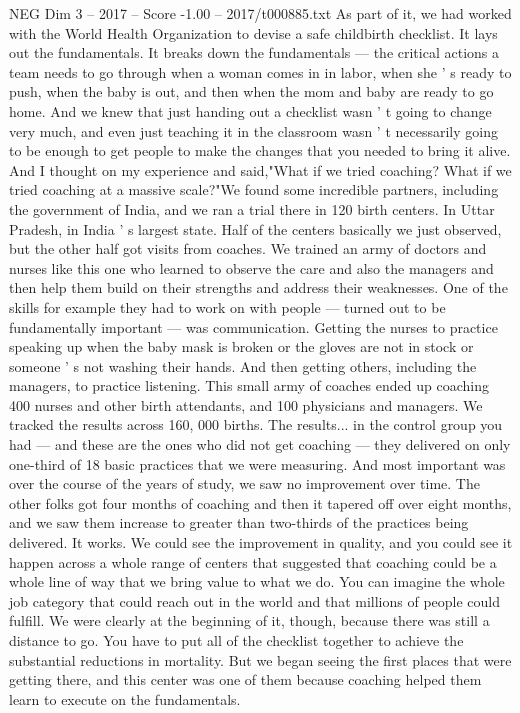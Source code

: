 \begin{textsample}{NEG Dim 3 – 2017 – Score -1.00 – 2017/t000885.txt}
As part of it, we had worked with the World Health Organization to devise a safe childbirth checklist.
It lays out the fundamentals.
It breaks down the fundamentals — the critical actions a team needs to go through when a woman comes in in labor, when she ' s ready to push, when the baby is out, and then when the mom and baby are ready to go home.
And we knew that just handing out a checklist wasn ' t going to change very much, and even just teaching it in the classroom wasn ' t necessarily going to be enough to get people to make the changes that you needed to bring it alive.
And I thought on my experience and said,"What if we tried coaching?
What if we tried coaching at a massive scale?"We found some incredible partners, including the government of India, and we ran a trial there in 120 birth centers.
In Uttar Pradesh, in India ' s largest state.
Half of the centers basically we just observed, but the other half got visits from coaches.
We trained an army of doctors and nurses like this one who learned to observe the care and also the managers and then help them build on their strengths and address their weaknesses.
One of the skills for example they had to work on with people — turned out to be fundamentally important — was communication.
Getting the nurses to practice speaking up when the baby mask is broken or the gloves are not in stock or someone ' s not washing their hands.
And then getting others, including the managers, to practice listening.
This small army of coaches ended up coaching 400 nurses and other birth attendants, and 100 physicians and managers.
We tracked the results across 160, 000 births.
The results... in the control group you had — and these are the ones who did not get coaching — they delivered on only one-third of 18 basic practices that we were measuring.
And most important was over the course of the years of study, we saw no improvement over time.
The other folks got four months of coaching and then it tapered off over eight months, and we saw them increase to greater than two-thirds of the practices being delivered.
It works.
We could see the improvement in quality, and you could see it happen across a whole range of centers that suggested that coaching could be a whole line of way that we bring value to what we do.
You can imagine the whole job category that could reach out in the world and that millions of people could fulfill.
We were clearly at the beginning of it, though, because there was still a distance to go.
You have to put all of the checklist together to achieve the substantial reductions in mortality.
But we began seeing the first places that were getting there, and this center was one of them because coaching helped them learn to execute on the fundamentals.

\end{textsample}

